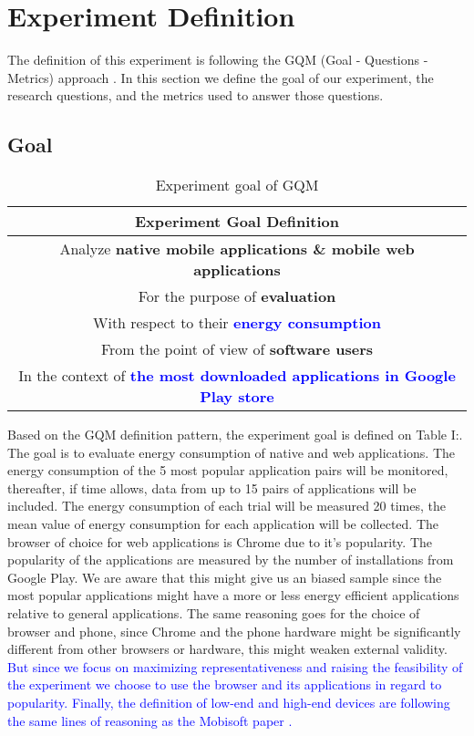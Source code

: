 \section{Experiment Definition}\label{sec:definition}
The definition of this experiment is following the GQM (Goal - Questions - Metrics) approach \cite{Basili:1992:SMM:137076}. In this section we define the goal of our experiment, the research questions, and the metrics used to answer those questions.

\subsection{Goal}
\begin{table}[ht]
\centering
\begin{tabular}{||c||} 
\hline
\textbf{Experiment Goal Definition}\\
\hline\hline
Analyze \textbf{native mobile applications \& mobile web applications} \\ 
For the purpose of \textbf{evaluation} \\
With respect to their \textbf{\textcolor{blue}{energy consumption} }\\
From the point of view of \textbf{software users}\\
In the context of \textcolor{blue}{\textbf{the most downloaded applications in Google Play store}}\\ [1ex] 
\hline
\end{tabular}
\caption{Experiment goal of GQM}
\label{tab:goal}
\end{table}
Based on the GQM definition pattern, the experiment goal is defined on Table I:. The goal is to evaluate energy consumption of  native and web applications. The energy consumption of the 5 most popular application pairs will be  monitored, thereafter, if time allows, data from up to 15 pairs of applications will be included. The energy consumption of each trial will be measured 20 times, the mean value of energy consumption for each application will be collected. The browser of choice for web applications is Chrome due to it's popularity\cite{Chromestats}. The popularity of the applications are measured by the number of installations from Google Play. \cite{App_statistics} We are aware that this might give us an biased sample since the most popular applications might have a more or less energy efficient applications relative to general applications. The same reasoning goes for the choice of browser and phone, since Chrome and the phone hardware might be significantly different from other browsers or hardware, this might weaken external validity. \textcolor{blue}{But since we focus on maximizing representativeness and raising the feasibility of the experiment we choose to use the browser and its applications in regard to  popularity.} 
\textcolor{blue}{Finally, the definition of low-end and high-end devices are following the same lines of reasoning as the Mobisoft paper \cite{mobisoft2017}.}

